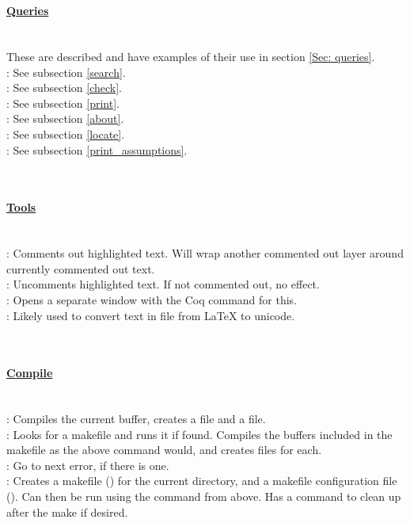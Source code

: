	
~\\
\paragraph{\underline{Queries}}
~\\
These are described and have examples of their use in section \ref{Sec: queries}. 
\\
 : See subsection \ref{search}. 
\\
 : See subsection \ref{check}. 
\\
 : See subsection \ref{print}. 
\\
 : See subsection \ref{about}. 
\\
 : See subsection \ref{locate}. 
\\
 : See subsection \ref{print_assumptions}. 



	
~\\
\paragraph{\underline{Tools}}
~\\
 : Comments out highlighted text. 
	Will wrap another commented out layer around currently commented out text. 
\\ 
 : Uncomments highlighted text. If not commented out, no effect. 
\\
 : Opens a separate window with the Coq command for this. 
\\
 : Likely used to convert text in file from LaTeX to unicode. 





	
~\\
\paragraph{\underline{Compile}}
~\\
 : Compiles the current buffer, creates a  file and a  file. 
\\
 : Looks for a makefile and runs it if found. 
	Compiles the buffers included in the makefile as the above command would, 
	and creates  files for each. 
\\
 : Go to next error, if there is one. %
\\
 : Creates a makefile () for the current directory, 
	and a makefile configuration file (). Can then be run using the  
	command from above. Has a  command to clean up after the make if desired. 
 




